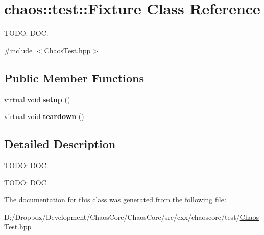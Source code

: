 \hypertarget{classchaos_1_1test_1_1_fixture}{}\section{chaos\+:\+:test\+:\+:Fixture Class Reference}
\label{classchaos_1_1test_1_1_fixture}


T\+O\+D\+O\+: D\+O\+C.  




{\ttfamily \#include $<$Chaos\+Test.\+hpp$>$}

\subsection*{Public Member Functions}
\begin{DoxyCompactItemize}
\item 
\hypertarget{classchaos_1_1test_1_1_fixture_a24819cdf1af94789cb66a95f736f53c5}{}virtual void {\bfseries setup} ()\label{classchaos_1_1test_1_1_fixture_a24819cdf1af94789cb66a95f736f53c5}

\item 
\hypertarget{classchaos_1_1test_1_1_fixture_ae8ea21c5226a988b64f0b2d166bc4a5e}{}virtual void {\bfseries teardown} ()\label{classchaos_1_1test_1_1_fixture_ae8ea21c5226a988b64f0b2d166bc4a5e}

\end{DoxyCompactItemize}


\subsection{Detailed Description}
T\+O\+D\+O\+: D\+O\+C. 

T\+O\+D\+O\+: D\+O\+C 

The documentation for this class was generated from the following file\+:\begin{DoxyCompactItemize}
\item 
D\+:/\+Dropbox/\+Development/\+Chaos\+Core/\+Chaos\+Core/src/cxx/chaoscore/test/\hyperlink{_chaos_test_8hpp}{Chaos\+Test.\+hpp}\end{DoxyCompactItemize}
